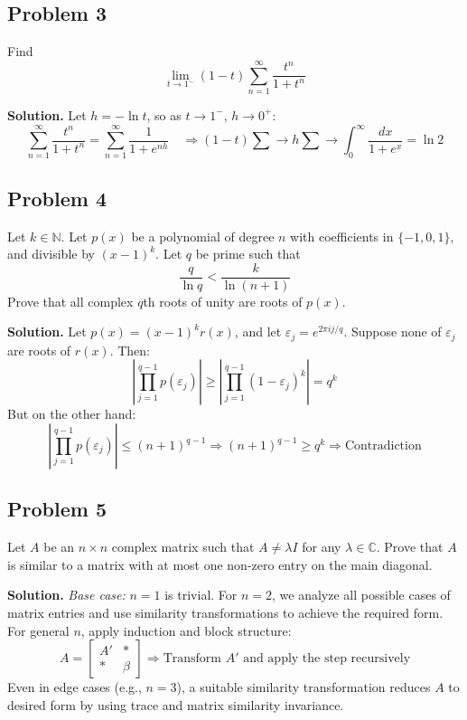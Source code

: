 \documentclass{article}
\begin{document}
\subsection*{Problem 3}

Find
\[
\lim_{t \to 1^-} (1 - t) \sum_{n=1}^{\infty} \frac{t^n}{1 + t^n}
\]

\textbf{Solution.}
Let \( h = -\ln t \), so as \( t \to 1^- \), \( h \to 0^+ \):
\[
\sum_{n=1}^\infty \frac{t^n}{1 + t^n}
= \sum_{n=1}^\infty \frac{1}{1 + e^{nh}} \quad \Rightarrow
(1 - t) \sum \to h \sum \to \int_0^\infty \frac{dx}{1 + e^x} = \ln 2
\]

\subsection*{Problem 4}

Let \( k \in \mathbb{N} \). Let \( p(x) \) be a polynomial of degree \( n \) with coefficients in \( \{-1, 0, 1\} \), and divisible by \( (x - 1)^k \). Let \( q \) be prime such that
\[
\frac{q}{\ln q} < \frac{k}{\ln(n+1)}
\]
Prove that all complex \( q \)th roots of unity are roots of \( p(x) \).

\textbf{Solution.}
Let \( p(x) = (x - 1)^k r(x) \), and let \( \varepsilon_j = e^{2\pi i j/q} \). Suppose none of \( \varepsilon_j \) are roots of \( r(x) \). Then:
\[
\left| \prod_{j=1}^{q-1} p(\varepsilon_j) \right| \geq \left| \prod_{j=1}^{q-1} (1 - \varepsilon_j)^k \right| = q^k
\]
But on the other hand:
\[
\left| \prod_{j=1}^{q-1} p(\varepsilon_j) \right| \leq (n + 1)^{q - 1}
\Rightarrow (n+1)^{q-1} \geq q^k \Rightarrow \text{Contradiction}
\]

\subsection*{Problem 5}

Let \( A \) be an \( n \times n \) complex matrix such that \( A \ne \lambda I \) for any \( \lambda \in \mathbb{C} \). Prove that \( A \) is similar to a matrix with at most one non-zero entry on the main diagonal.

\textbf{Solution.}
\emph{Base case:} \( n = 1 \) is trivial. For \( n = 2 \), we analyze all possible cases of matrix entries and use similarity transformations to achieve the required form. For general \( n \), apply induction and block structure:
\[
A = \begin{bmatrix}
A' & * \\
* & \beta
\end{bmatrix}
\Rightarrow \text{Transform } A' \text{ and apply the step recursively}
\]
Even in edge cases (e.g., \( n = 3 \)), a suitable similarity transformation reduces \( A \) to desired form by using trace and matrix similarity invariance.
\end{document}
